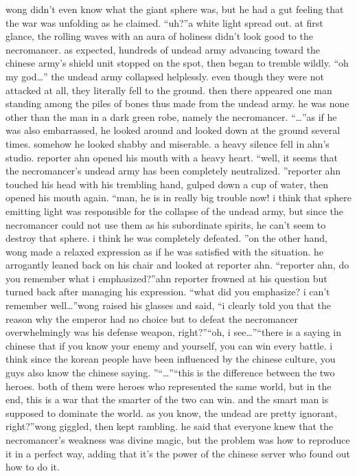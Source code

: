  wong didn’t even know what the giant sphere was, but he had a gut feeling that the war was unfolding as he claimed.
“uh?”a white light spread out.
 at first glance, the rolling waves with an aura of holiness didn’t look good to the necromancer.
as expected, hundreds of undead army advancing toward the chinese army’s shield unit stopped on the spot, then began to tremble wildly.
“oh my god…”
the undead army collapsed helplessly.
 even though they were not attacked at all, they literally fell to the ground.
 then there appeared one man standing among the piles of bones thus made from the undead army.
he was none other than the man in a dark green robe, namely the necromancer.
“…”as if he was also embarrassed, he looked around and looked down at the ground several times.
 somehow he looked shabby and miserable.
a heavy silence fell in ahn’s studio.
reporter ahn opened his mouth with a heavy heart.
“well, it seems that the necromancer’s undead army has been completely neutralized.
”reporter ahn touched his head with his trembling hand, gulped down a cup of water, then opened his mouth again.
“man, he is in really big trouble now! i think that sphere emitting light was responsible for the collapse of the undead army, but since the necromancer could not use them as his subordinate spirits, he can’t seem to destroy that sphere.
 i think he was completely defeated.
”on the other hand, wong made a relaxed expression as if he was satisfied with the situation.
he arrogantly leaned back on his chair and looked at reporter ahn.
“reporter ahn, do you remember what i emphasized?”ahn reporter frowned at his question but turned back after managing his expression.
“what did you emphasize? i can’t remember well…”wong raised his glasses and said, “i clearly told you that the reason why the emperor had no choice but to defeat the necromancer overwhelmingly was his defense weapon, right?”“oh, i see…”“there is a saying in chinese that if you know your enemy and yourself, you can win every battle.
 i think since the korean people have been influenced by the chinese culture, you guys also know the chinese saying.
”“…”“this is the difference between the two heroes.
 both of them were heroes who represented the same world, but in the end, this is a war that the smarter of the two can win.
 and the smart man is supposed to dominate the world.
 as you know, the undead are pretty ignorant, right?”wong giggled, then kept rambling.
 he said that everyone knew that the necromancer’s weakness was divine magic, but the problem was how to reproduce it in a perfect way, adding that it’s the power of the chinese server who found out how to do it.
